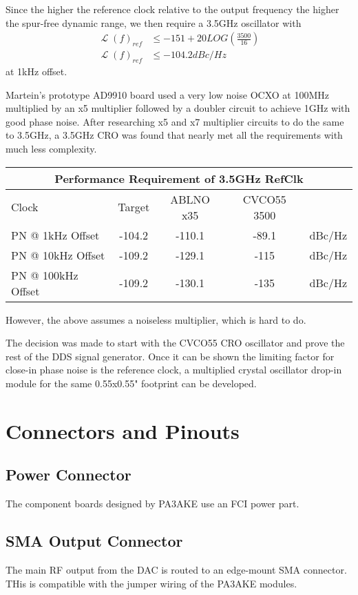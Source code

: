 \documentclass[letterpaper,12pt]{article}
\DeclareMathOperator{\Lph}{\mathscr{L}}
\begin{document}
Since the higher the reference clock relative to the output frequency the
higher the spur-free dynamic range, we then require a 3.5GHz oscillator 
with 
\begin{align*}  
  \Lph(f)_{ref} &\leq -151 + 20LOG(\frac{3500}{16}) \\
  \Lph(f)_{ref} &\leq -104.2 dBc/Hz
\end{align*}
at 1kHz offset.
\par 
Martein's prototype AD9910 board used a very low noise OCXO at 100MHz 
multiplied by an x5 multiplier followed by a doubler circuit to achieve 
1GHz with good phase noise. After researching x5 and x7 multiplier circuits
to do the same to 3.5GHz, a 3.5GHz CRO was found that nearly met all the 
requirements with much less complexity.
\begin{center}
\begin{tabular}{| l | c | c | c | r |}
\hline
\multicolumn{5}{|c|}{Performance Requirement of 3.5GHz RefClk} \\ \hline 
Clock & Target & ABLNO x35 & CVCO55 3500 & \\ \hline
PN @ 1kHz Offset & -104.2 & -110.1 & -89.1 & dBc/Hz \\ \hline
PN @ 10kHz Offset & -109.2 & -129.1 & -115 & dBc/Hz \\ \hline
PN @ 100kHz Offset & -109.2 & -130.1 & -135 & dBc/Hz \\ \hline
\end{tabular}
\end{center}
However, the above assumes a noiseless multiplier, which is hard to do.
\par
The decision was made to start with the CVCO55 CRO oscillator and prove 
the rest of the DDS signal generator. Once it can be shown the limiting 
factor for close-in phase noise is the reference clock, a multiplied 
crystal oscillator drop-in module for the same 0.55x0.55" footprint can 
be developed.


\section{Connectors and Pinouts}
\subsection{Power Connector}
The component boards designed by PA3AKE use an FCI power part.

\subsection{SMA Output Connector} 
The main RF output from the DAC is routed to an edge-mount SMA connector. 
THis is compatible with the jumper wiring of the PA3AKE modules.
\end{document}
